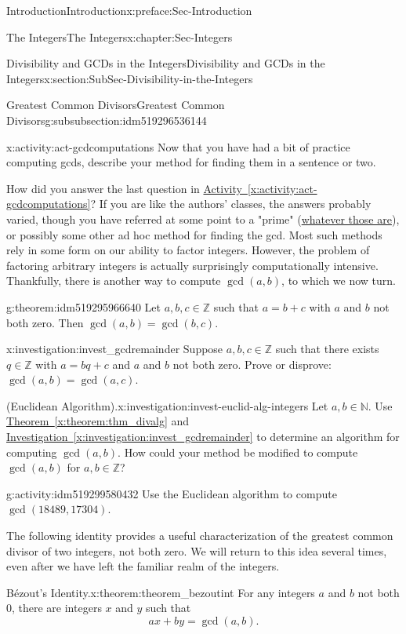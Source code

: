 \documentclass[oneside,10pt,]{book}
\newcommand{\xreffont}{\relax}
\numberwithin{equation}{section}
\def\Z{{\mathbb Z}}
\def\N{{\mathbb N}}
\begin{document}
\begin{preface}{Introduction}{}{Introduction}{}{}{x:preface:Sec-Introduction}
\begin{chapterptx}{The Integers}{}{The Integers}{}{}{x:chapter:Sec-Integers}
\begin{sectionptx}{Divisibility and GCDs in the Integers}{}{Divisibility and GCDs in the Integers}{}{}{x:section:SubSec-Divisibility-in-the-Integers}
\begin{subsubsectionptx}{Greatest Common Divisors}{}{Greatest Common Divisors}{}{}{g:subsubsection:idm519296536144}
\begin{activity}{}{x:activity:act-gcdcomputations}
Now that you have had a bit of practice computing gcds, describe your method for finding them in a sentence or two.%
\end{activity}
How did you answer the last question in \hyperref[x:activity:act-gcdcomputations]{Activity~{\xreffont\ref{x:activity:act-gcdcomputations}}}? If you are like the authors' classes, the answers probably varied, though you have referred at some point to a "prime" (\hyperref[x:definition:def-primeinteger]{whatever those are}), or possibly some other ad hoc method for finding the gcd. Most such methods rely in some form on our ability to factor integers. However, the problem of factoring arbitrary integers is actually surprisingly computationally intensive. Thankfully, there is another way to compute \(\gcd(a,b)\), to which we now turn.%
\begin{theorem}{}{}{g:theorem:idm519295966640}%
Let \(a,b,c\in\Z\) such that \(a = b+c\) with \(a\) and \(b\) not both zero. Then \(\gcd(a,b) = \gcd(b,c)\).%
\end{theorem}
\begin{investigation}{}{x:investigation:invest_gcdremainder}%
Suppose \(a,b,c\in\Z\) such that there exists \(q\in\Z\) with \(a = bq + c\) and \(a\) and \(b\) not both zero. Prove or disprove: \(\gcd(a,b)=\gcd(a,c)\).%
\end{investigation}
\begin{investigation}{(Euclidean Algorithm).}{x:investigation:invest-euclid-alg-integers}%
Let \(a,b\in \N\). Use \hyperref[x:theorem:thm_divalg]{Theorem~{\xreffont\ref{x:theorem:thm_divalg}}} and \hyperref[x:investigation:invest_gcdremainder]{Investigation~{\xreffont\ref{x:investigation:invest_gcdremainder}}} to determine an algorithm for computing \(\gcd(a,b)\). How could your method be modified to compute \(\gcd(a,b)\) for \(a,b\in\Z\)?%
\end{investigation}
\begin{activity}{}{g:activity:idm519299580432}%
Use the Euclidean algorithm to compute \(\gcd(18489,17304)\).%
\end{activity}
The following identity provides a useful characterization of the greatest common divisor of two integers, not both zero. We will return to this idea several times, even after we have left the familiar realm of the integers.%
\begin{theorem}{Bézout's Identity.}{}{x:theorem:theorem_bezoutint}%
%
For any integers \(a\) and \(b\) not both 0, there are integers \(x\) and \(y\) such that%
\begin{equation*}
ax + by = \gcd(a,b)\text{.}
\end{equation*}
%




\end{theorem}
\end{subsubsectionptx}
\end{sectionptx}
\end{chapterptx}
\end{preface}
\end{document}
